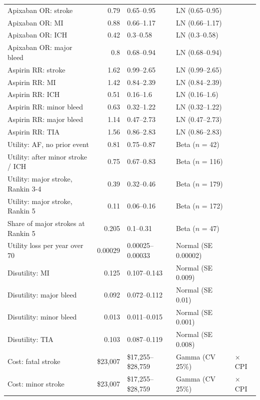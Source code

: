 \documentclass[11pt,letterpaper]{article}
\begin{document}
\begin{longtable}{@{}p{5.6cm}rp{2.7cm}p{3.1cm}l@{}}
Apixaban OR: stroke & 0.79 & 0.65--0.95 & LN (0.65--0.95) & \cite{cadthwe} \\
Apixaban OR: MI & 0.88 & 0.66--1.17 & LN (0.66--1.17) & \cite{cadthwe} \\
Apixaban OR: ICH & 0.42 & 0.3--0.58 & LN (0.3--0.58) & \cite{cadthwe} \\
Apixaban OR: major bleed & 0.8 & 0.68--0.94 & LN (0.68--0.94) & \cite{cadthwe} \\
Aspirin RR: stroke & 1.62 & 0.99--2.65 & LN (0.99--2.65) & \cite{cadthwe} \\
Aspirin RR: MI & 1.42 & 0.84--2.39 & LN (0.84--2.39) & \cite{cadthwe} \\
Aspirin RR: ICH & 0.51 & 0.16--1.6 & LN (0.16--1.6) & \cite{cadthwe} \\
Aspirin RR: minor bleed & 0.63 & 0.32--1.22 & LN (0.32--1.22) & \cite{cadthwe} \\
Aspirin RR: major bleed & 1.14 & 0.47--2.73 & LN (0.47--2.73) & \cite{cadthwe} \\
Aspirin RR: TIA & 1.56 & 0.86--2.83 & LN (0.86--2.83) & \cite{cadthwe} \\
Utility: AF, no prior event & 0.81 & 0.75--0.87 & Beta ($n$ = 42) & \cite{cadthwe} \\
Utility: after minor stroke / ICH & 0.75 & 0.67--0.83 & Beta ($n$ = 116) & \cite{cadthwe} \\
Utility: major stroke, Rankin 3-4 & 0.39 & 0.32--0.46 & Beta ($n$ = 179) & \cite{cadthwe} \\
Utility: major stroke, Rankin 5 & 0.11 & 0.06--0.16 & Beta ($n$ = 172) & \cite{cadthwe} \\
Share of major strokes at Rankin 5 & 0.205 & 0.1--0.31 & Beta ($n$ = 47) & \cite{cadthwe} \\
Utility loss per year over 70 & 0.00029 & 0.00025--0.00033 & Normal (SE 0.00002) & \cite{cadthwe} \\
Disutility: MI & 0.125 & 0.107--0.143 & Normal (SE 0.009) & \cite{cadthwe} \\
Disutility: major bleed & 0.092 & 0.072--0.112 & Normal (SE 0.01) & \cite{cadthwe} \\
Disutility: minor bleed & 0.013 & 0.011--0.015 & Normal (SE 0.001) & \cite{cadthwe} \\
Disutility: TIA & 0.103 & 0.087--0.119 & Normal (SE 0.008) & \cite{cadthwe} \\
Cost: fatal stroke & \$23,007 & \$17,255--\$28,759 & Gamma (CV 25\%) & \cite{cadthwe} $\times$ CPI \\
Cost: minor stroke & \$23,007 & \$17,255--\$28,759 & Gamma (CV 25\%) & \cite{cadthwe} $\times$ CPI \\

\end{longtable}
\end{document}

